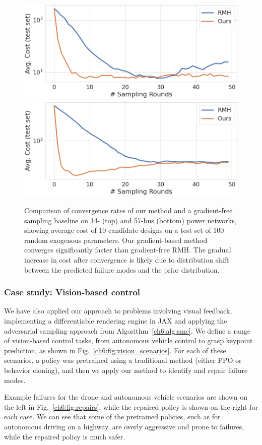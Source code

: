 \begin{figure}[tb]
    \centering
    \includegraphics[width=0.45\linewidth]{images/ch6/14_bus_training_curves.png}
    \includegraphics[width=0.45\linewidth]{images/ch6/57_bus_training_curves.png}
    \caption{Comparison of convergence rates of our method and a gradient-free sampling baseline on 14- (top) and 57-bus (bottom) power networks, showing average cost of 10 candidate designs on a test set of 100 random exogenous parameters. Our gradient-based method converges significantly faster than gradient-free RMH. The gradual increase in cost after convergence is likely due to distribution shift between the predicted failure modes and the prior distribution.}
    \label{ch6:fig:training_curves}
\end{figure}

\subsubsection{Case study: Vision-based control}

We have also applied our approach to problems involving visual feedback, implementing a differentiable rendering engine in JAX and applying the adversarial sampling approach from Algorithm~\ref{ch6:alg:smc}. We define a range of vision-based control tasks, from autonomous vehicle control to grasp keypoint prediction, as shown in Fig.~\ref{ch6:fig:vision_scenarios}. For each of these scenarios, a policy was pretrained using a traditional method (either PPO or behavior cloning), and then we apply our method to identify and repair failure modes.

Example failures for the drone and autonomous vehicle scenarios are shown on the left in Fig.~\ref{ch6:fig:repairs}, while the repaired policy is shown on the right for each case. We can see that some of the pretrained policies, such as for autonomous driving on a highway, are overly aggressive and prone to failures, while the repaired policy is much safer.

